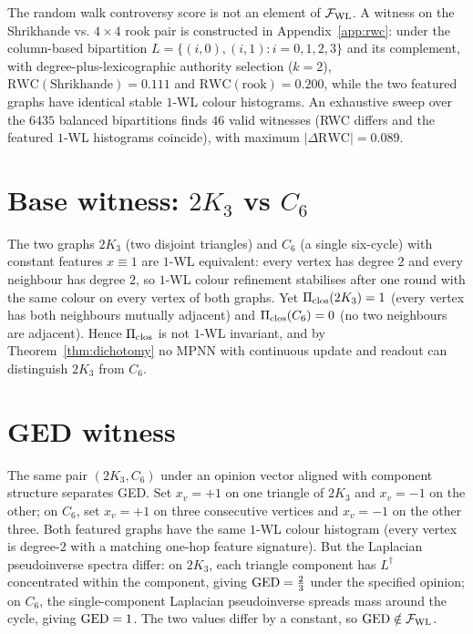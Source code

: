 \begin{proposition}\label{rem:rwc}
The random walk controversy score \citep{Garimella18} is not an
element of $\mathcal{F}_{\mathrm{WL}}$. A witness on the Shrikhande vs.
$4{\times}4$ rook pair is constructed in
Appendix~\ref{app:rwc}: under the column-based bipartition
$L = \{(i, 0), (i, 1) : i = 0, 1, 2, 3\}$ and its complement,
with degree-plus-lexicographic authority selection ($k = 2$),
$\mathrm{RWC}(\text{Shrikhande}) = 0.111$ and
$\mathrm{RWC}(\text{rook}) = 0.200$, while the two featured
graphs have identical stable $1$-WL colour histograms. An
exhaustive sweep over the $6435$ balanced bipartitions finds
$46$ valid witnesses (RWC differs and the featured $1$-WL
histograms coincide), with maximum $|\Delta\mathrm{RWC}| = 0.089$.
\end{proposition}

\section{Base witness: $2K_3$ vs $C_6$}\label{app:warmup}

The two graphs $2K_3$ (two disjoint triangles) and $C_6$ (a single
six-cycle) with constant features $x \equiv 1$ are $1$-WL equivalent:
every vertex has degree $2$ and every neighbour has degree $2$, so
$1$-WL colour refinement stabilises after one round with the same
colour on every vertex of both graphs. Yet
$\Pi_{\mathrm{clos}}(2K_3) = 1$ (every vertex has both neighbours mutually
adjacent) and $\Pi_{\mathrm{clos}}(C_6) = 0$ (no two neighbours are
adjacent). Hence $\Pi_{\mathrm{clos}}$ is not $1$-WL invariant, and by
Theorem~\ref{thm:dichotomy} no MPNN with continuous update and
readout can distinguish $2K_3$ from $C_6$.

\section{GED witness}\label{app:ged}

The same pair $(2K_3, C_6)$ under an opinion vector aligned with
component structure separates GED. Set $x_v = +1$ on one triangle
of $2K_3$ and $x_v = -1$ on the other; on $C_6$, set $x_v = +1$ on
three consecutive vertices and $x_v = -1$ on the other three. Both
featured graphs have the same $1$-WL colour histogram (every vertex
is degree-$2$ with a matching one-hop feature signature). But the
Laplacian pseudoinverse spectra differ: on $2K_3$, each triangle
component has $L^\dagger$ concentrated within the component, giving
$\mathrm{GED} = \tfrac{2}{3}$ under the specified opinion; on $C_6$, the
single-component Laplacian pseudoinverse spreads mass around the
cycle, giving $\mathrm{GED} = 1$. The two values differ by a constant, so
$\mathrm{GED} \notin \mathcal{F}_{\mathrm{WL}}$.

